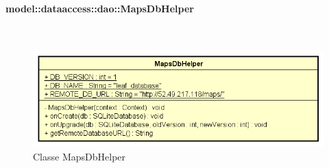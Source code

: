 \documentclass[../DefinizioneDiProdotto.tex]{subfiles}
\begin{document}
\paragraph{model::dataaccess::dao::MapsDbHelper}
\
\begin{figure}[H]
	\centering
	\includegraphics[width=\maxwidth]{img/MapsDbHelper.png}
	\caption{Classe MapsDbHelper}\label{fig:model::dataaccess::dao::MapsDbHelper} 
\end{figure}
\end{document}
